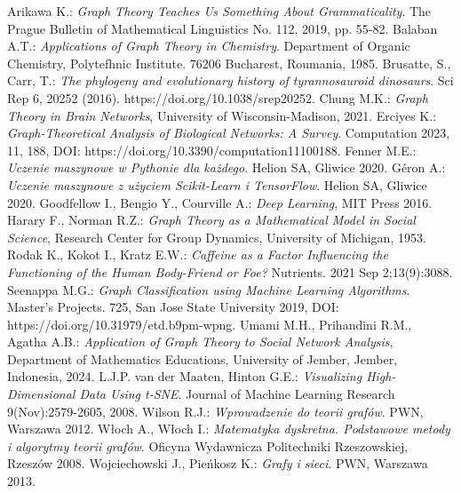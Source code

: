 
\begin{thebibliography}{4}
     Arikawa K.: \textit{Graph Theory Teaches Us Something About Grammaticality}. The Prague Bulletin of Mathematical Linguistics No. 112, 2019, pp. 55-82.
     Balaban A.T.: \textit{Applications of Graph Theory in Chemistry}. Department of Organic Chemistry, Polytefhnic Institute. 76206 Bucharest, Roumania, 1985.
     Brusatte, S., Carr, T.: \textit{The phylogeny and evolutionary history of tyrannosauroid dinosaurs}. Sci Rep 6, 20252 (2016). https://doi.org/10.1038/srep20252.
     Chung M.K.: \textit{Graph Theory in Brain Networks}, University of Wisconsin-Madison, 2021.
     Erciyes K.: \textit{Graph-Theoretical Analysis of Biological Networks: A Survey}. Computation 2023, 11, 188, DOI: https://doi.org/10.3390/computation11100188.
     Fenner M.E.: \textit{Uczenie maszynowe w Pythonie dla każdego}. Helion SA, Gliwice 2020.
     Géron A.: \textit{Uczenie maszynowe z użyciem Scikit-Learn i TensorFlow}. Helion SA, Gliwice 2020.
     Goodfellow I., Bengio Y., Courville A.: \textit{Deep Learning}, MIT Press 2016.
     Harary F., Norman R.Z.: \textit{Graph Theory as a Mathematical Model in Social Science}, Research Center for Group Dynamics, University of Michigan, 1953.
     Rodak K., Kokot I., Kratz E.W.: \textit{Caffeine as a Factor Influencing the Functioning of the Human Body-Friend or Foe?} Nutrients. 2021 Sep 2;13(9):3088.
     Seenappa M.G.: \textit{Graph Classification using Machine Learning Algorithms}. Master's Projects. 725, San Jose State University 2019, DOI: https://doi.org/10.31979/etd.b9pm-wpng.
     Umami M.H., Prihandini R.M., Agatha A.B.: \textit{Application of Graph Theory to Social Network Analysis}, Department of Mathematics Educations, University of Jember, Jember, Indonesia, 2024.
     L.J.P. van der Maaten, Hinton G.E.: \textit{Visualizing High-Dimensional Data Using t-SNE}. Journal of Machine Learning Research 9(Nov):2579-2605, 2008.
     Wilson R.J.: \textit{Wprowadzenie do teorii grafów}. PWN, Warszawa 2012.
     Włoch A., Włoch I.: \textit{Matematyka dyskretna. Podstawowe metody i algorytmy teorii grafów}. Oficyna Wydawnicza Politechniki Rzeszowskiej, Rzeszów 2008.
     Wojciechowski J., Pieńkosz K.: \textit{Grafy i sieci}. PWN, Warszawa 2013.

\end{thebibliography}
